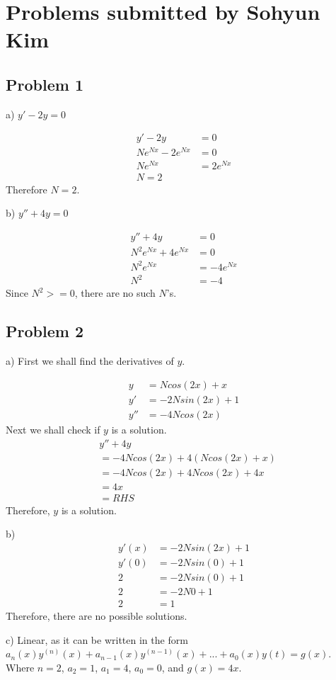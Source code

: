\documentclass{article}
\begin{document}
\noindent
\section{Problems submitted by Sohyun Kim}
\subsection{Problem 1}
a) $y' - 2y = 0$

\begin{align*}
  y' - 2y &= 0
  \\ Ne^{Nx} - 2e^{Nx} &= 0
  \\ Ne^{Nx} &= 2e^{Nx}
  \\ N = 2
\end{align*}
Therefore $N = 2$.

\vspace{1em}
\noindent
b) $y'' + 4y = 0$

\begin{align*}
  y'' + 4y &= 0
  \\ N^2e^{Nx} + 4e^{Nx} &= 0
  \\ N^2e^{Nx} &= -4e^{Nx}
  \\ N^2 &= -4
\end{align*}
Since $N^2 >= 0$, there are no such $N$'s.

\subsection{Problem 2}

a) First we shall find the derivatives of $y$.

\begin{align*}
  y &= Ncos(2x) + x
  \\ y' &= -2Nsin(2x) + 1
  \\ y'' &= -4Ncos(2x)
\end{align*}
Next we shall check if $y$ is a solution.
\begin{align*}
  &y'' + 4y
  \\ &= -4Ncos(2x) + 4(Ncos(2x) + x)
  \\ &= -4Ncos(2x) + 4Ncos(2x) + 4x
  \\ &= 4x
  \\ &= RHS
\end{align*}
Therefore, $y$ is a solution.

\vspace{1em}
\noindent
b)
\begin{align*}
  y'(x) &= -2Nsin(2x) + 1
  \\ y'(0) &= -2Nsin(0) + 1
  \\ 2 &= -2Nsin(0) + 1
  \\ 2 &= -2N0 + 1
  \\ 2 &= 1
\end{align*}
Therefore, there are no possible solutions.

\vspace{1em}
\noindent
c) Linear, as it can be written in the form
$a_n(x)y^{(n)}(x) + a_{n-1}(x)y^{(n-1)}(x) + ... + a_0(x)y(t) = g(x)$.
Where $n = 2$,
$a_2 = 1$,
$a_1 = 4$,
$a_0 = 0$, and
$g(x) = 4x$.
\end{document}
